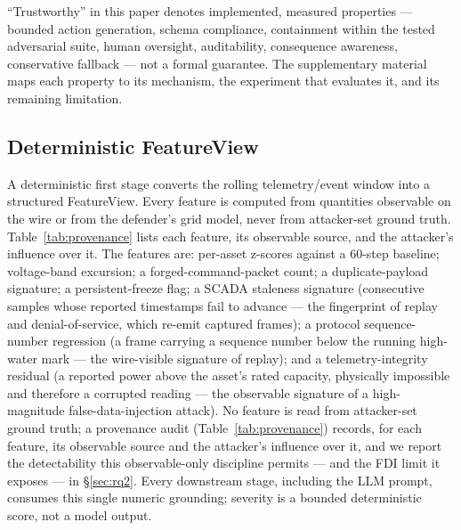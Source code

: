 ``Trustworthy'' in this paper denotes implemented, measured properties
--- bounded action generation, schema compliance, containment within the
tested adversarial suite, human oversight, auditability, consequence
awareness, conservative fallback --- not a formal guarantee. The supplementary
material maps each property to its mechanism, the experiment that evaluates it,
and its remaining limitation.

\subsection{Deterministic FeatureView}
\label{sec:method-featureview}
A deterministic first stage converts the rolling telemetry/event window
into a structured FeatureView. Every feature is computed from quantities
observable on the wire or from the defender's grid model, never from
attacker-set ground truth. Table~\ref{tab:provenance} lists each feature,
its observable source, and the attacker's influence over it. The features
are: per-asset z-scores against a 60-step baseline; voltage-band
excursion; a forged-command-packet count; a duplicate-payload signature;
a persistent-freeze flag; a SCADA staleness signature (consecutive
samples whose reported timestamps fail to advance --- the fingerprint of
replay and denial-of-service, which re-emit captured frames); a protocol
sequence-number regression (a frame carrying a sequence number below the
running high-water mark --- the wire-visible signature of replay); and a
telemetry-integrity residual (a reported power above the asset's rated
capacity, physically impossible and therefore a corrupted reading ---
the observable signature of a high-magnitude false-data-injection
attack). No feature is read from attacker-set ground truth; a provenance
audit (Table~\ref{tab:provenance}) records, for each feature, its
observable source and the attacker's influence over it, and we report the
detectability this observable-only discipline permits --- and the FDI
limit it exposes --- in \S\ref{sec:rq2}\@. Every downstream stage, including the LLM prompt,
consumes this single numeric grounding; severity is a bounded
deterministic score, not a model output.



